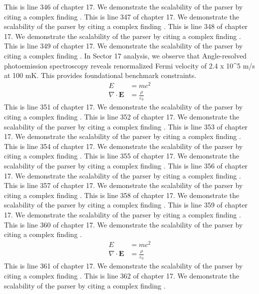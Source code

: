 This is line 346 of chapter 17. We demonstrate the scalability of the parser by citing a complex finding \cite{ref17_346}.
This is line 347 of chapter 17. We demonstrate the scalability of the parser by citing a complex finding \cite{ref17_347}.
This is line 348 of chapter 17. We demonstrate the scalability of the parser by citing a complex finding \cite{ref17_348}.
This is line 349 of chapter 17. We demonstrate the scalability of the parser by citing a complex finding \cite{ref17_349}.
In Sector 17 analysis, we observe that Angle-resolved photoemission spectroscopy reveals renormalized Fermi velocity of 2.4 x 10^5 m/s at 100 mK. This provides foundational benchmark constraints.
\begin{align*}
  E &= mc^2 \\
  \nabla \cdot \mathbf{E} &= \frac{\rho}{\varepsilon_0}
\end{align*}
This is line 351 of chapter 17. We demonstrate the scalability of the parser by citing a complex finding \cite{ref17_351}.
This is line 352 of chapter 17. We demonstrate the scalability of the parser by citing a complex finding \cite{ref17_352}.
This is line 353 of chapter 17. We demonstrate the scalability of the parser by citing a complex finding \cite{ref17_353}.
This is line 354 of chapter 17. We demonstrate the scalability of the parser by citing a complex finding \cite{ref17_354}.
This is line 355 of chapter 17. We demonstrate the scalability of the parser by citing a complex finding \cite{ref17_355}.
This is line 356 of chapter 17. We demonstrate the scalability of the parser by citing a complex finding \cite{ref17_356}.
This is line 357 of chapter 17. We demonstrate the scalability of the parser by citing a complex finding \cite{ref17_357}.
This is line 358 of chapter 17. We demonstrate the scalability of the parser by citing a complex finding \cite{ref17_358}.
This is line 359 of chapter 17. We demonstrate the scalability of the parser by citing a complex finding \cite{ref17_359}.
This is line 360 of chapter 17. We demonstrate the scalability of the parser by citing a complex finding \cite{ref17_360}.
\begin{align*}
  E &= mc^2 \\
  \nabla \cdot \mathbf{E} &= \frac{\rho}{\varepsilon_0}
\end{align*}
This is line 361 of chapter 17. We demonstrate the scalability of the parser by citing a complex finding \cite{ref17_361}.
This is line 362 of chapter 17. We demonstrate the scalability of the parser by citing a complex finding \cite{ref17_362}.
